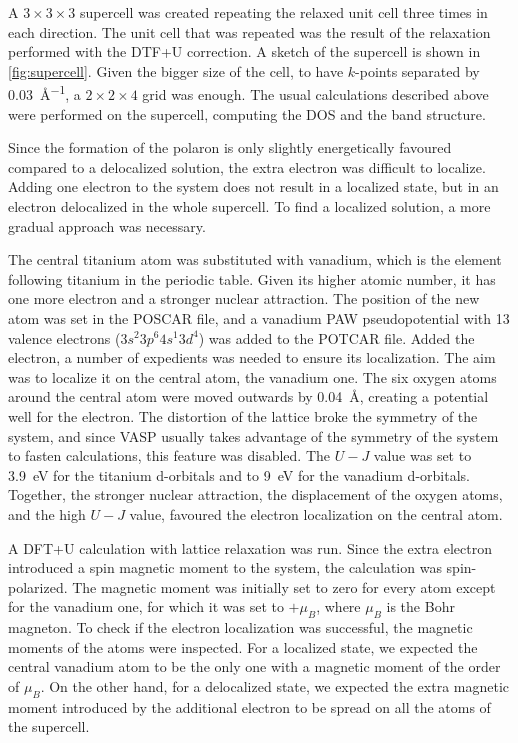 A $3\times3\times3$ supercell was created repeating the relaxed unit cell three times in each direction. The unit cell that was repeated was the result of the relaxation performed with the DTF+U correction. A sketch of the supercell is shown in \cref{fig:supercell}. Given the bigger size of the cell, to have $k$-points separated by \SI{0.03}{\angstrom^{-1}}, a $2\times2\times4$ grid was enough. The usual calculations described above were performed on the supercell, computing the DOS and the band structure.

Since the formation of the polaron is only slightly energetically favoured compared to a delocalized solution, the extra electron was difficult to localize. Adding one electron to the system does not result in a localized state, but in an electron delocalized in the whole supercell. To find a localized solution, a more gradual approach was necessary.

The central titanium atom was substituted with vanadium, which is the element following titanium in the periodic table. Given its higher atomic number, it has one more electron and a stronger nuclear attraction. The position of the new atom was set in the POSCAR file, and a vanadium PAW pseudopotential with 13 valence electrons ($3s^2 3p^6 4s^1 3d^4$) was added to the POTCAR file. Added the electron, a number of expedients was needed to ensure its localization. The aim was to localize it on the central atom, the vanadium one. The six oxygen atoms around the central atom were moved outwards by \SI{0.04}{\angstrom}, creating a potential well for the electron. The distortion of the lattice broke the symmetry of the system, and since VASP usually takes advantage of the symmetry of the system to fasten calculations, this feature was disabled. The $U-J$ value was set to \SI{3.9}{eV} for the titanium d-orbitals and to \SI{9}{eV} for the vanadium d-orbitals. Together, the stronger nuclear attraction, the displacement of the oxygen atoms, and the high $U-J$ value, favoured the electron localization on the central atom.

A DFT+U calculation with lattice relaxation was run.  Since the extra electron introduced a spin magnetic moment to the system, the calculation was spin-polarized. The magnetic moment was initially set to zero for every atom except for the vanadium one, for which it was set to $+\mu_B$, where $\mu_B$ is the Bohr magneton. To check if the electron localization was successful, the magnetic moments of the atoms were inspected. For a localized state, we expected the central vanadium atom to be the only one with a magnetic moment of the order of $\mu_B$. On the other hand, for a delocalized state, we expected the extra magnetic moment introduced by the additional electron to be spread on all the atoms of the supercell.

